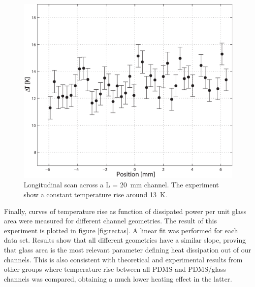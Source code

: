 \documentclass[twocolumn]{svjour3}       %
\begin{document}

\begin{figure}[h!]
\centering
\includegraphics[width=\columnwidth]{figs/fig7.eps}
\caption{Longitudinal scan across a L = 20~mm channel. The experiment show a constant temperature rise around 13~K.\label{fig:long}}
\end{figure}

Finally, curves of temperature rise as function of dissipated power per unit glass area were measured for different channel geometries. The result of this experiment is plotted in figure \ref{fig:rectas}. A linear fit was performed for each data set. Results show that all different geometries have a similar slope, proving that glass area is the most relevant parameter defining heat dissipation out of our channels. This is also consistent with theoretical and experimental results from other groups \cite{erickson2003} where temperature rise between all PDMS and PDMS/glass channels was compared, obtaining a much lower heating effect in the latter. 
\end{document}
